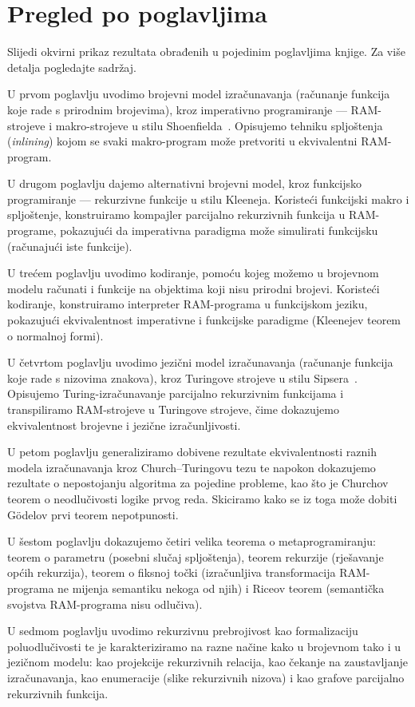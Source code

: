 \section{Pregled po poglavljima}
Slijedi okvirni prikaz rezultata obrađenih u pojedinim poglavljima knjige. Za više detalja pogledajte sadržaj.

U prvom poglavlju uvodimo brojevni model izračunavanja (računanje funkcija koje rade s prirodnim brojevima), kroz imperativno programiranje --- RAM-strojeve i makro-strojeve u stilu Shoenfielda~\cite{shoenfield}. Opisujemo tehniku spljoštenja (\emph{inlining}) kojom se svaki makro-program može pretvoriti u ekvivalentni RAM-program.

U drugom poglavlju dajemo alternativni brojevni model, kroz funkcijsko programiranje --- rekurzivne funkcije u stilu Kleeneja. Koristeći funkcijski makro i spljoštenje, konstruiramo kompajler parcijalno rekurzivnih funkcija u RAM-programe, pokazujući da imperativna paradigma može simulirati funkcijsku (računajući iste funkcije).

U trećem poglavlju uvodimo kodiranje, pomoću kojeg možemo u brojevnom modelu računati i funkcije na objektima koji nisu prirodni brojevi. Koristeći kodiranje, konstruiramo interpreter RAM-programa u funkcijskom jeziku, pokazujući ekvivalentnost imperativne i funkcijske paradigme (Kleenejev teorem o normalnoj formi).

U četvrtom poglavlju uvodimo jezični model izračunavanja (računanje funkcija koje rade s nizovima znakova), kroz Turingove strojeve u stilu Sipsera~\cite{sipser}. Opisujemo Turing-izračunavanje parcijalno rekurzivnim funkcijama i transpiliramo RAM-strojeve u Turingove strojeve, čime dokazujemo ekvivalentnost brojevne i jezične izračunljivosti.

U petom poglavlju generaliziramo dobivene rezultate ekvivalentnosti raznih modela izračunavanja kroz Church--\!Turingovu tezu te napokon dokazujemo rezultate o nepostojanju algoritma za pojedine probleme, kao što je Churchov teorem o neodlučivosti logike prvog reda. Skiciramo kako se iz toga može dobiti G\"odelov prvi teorem nepotpunosti.

U šestom poglavlju dokazujemo četiri velika teorema o metaprogramiranju: teorem o parametru (posebni slučaj spljoštenja), teorem rekurzije (rješavanje općih rekurzija), teorem o fiksnoj točki (izračunljiva transformacija RAM-programa ne mijenja semantiku nekoga od njih) i Riceov teorem (semantička svojstva RAM-programa nisu odlučiva).

U sedmom poglavlju uvodimo rekurzivnu prebrojivost kao formalizaciju poluodlučivosti te je karakteriziramo na razne načine kako u brojevnom tako i u jezičnom modelu: kao projekcije rekurzivnih relacija, kao čekanje na zaustavljanje izračunavanja, kao enumeracije (slike rekurzivnih nizova) i kao grafove parcijalno rekurzivnih funkcija.
